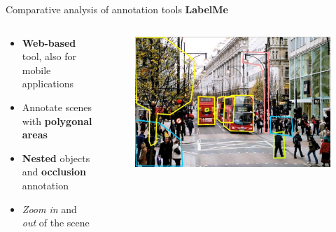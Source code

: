 \documentclass{beamer}
\begin{document}
\begin{tframe}{Comparative analysis of annotation tools}
\textbf{LabelMe} 
\begin{columns}[t] %
\begin{column}{.5\textwidth}
\begin{itemize}
\item \textbf{Web-based} tool, also for mobile applications
\vspace{0.2cm}
\item Annotate scenes with \textbf{polygonal areas}
\vspace{0.2cm}
\item \textbf{Nested} objects and \textbf{occlusion} annotation
\vspace{0.2cm}
\item \emph{Zoom in} and \emph{out} of the scene
\end{itemize}
\end{column}%
\begin{column}{.3\textwidth}
\begin{figure}[h]
\centering
\includegraphics[width=1\textwidth]{images/labelme.jpg}
\end{figure}
\end{column}%
\end{columns}
\end{tframe}
\end{document}
